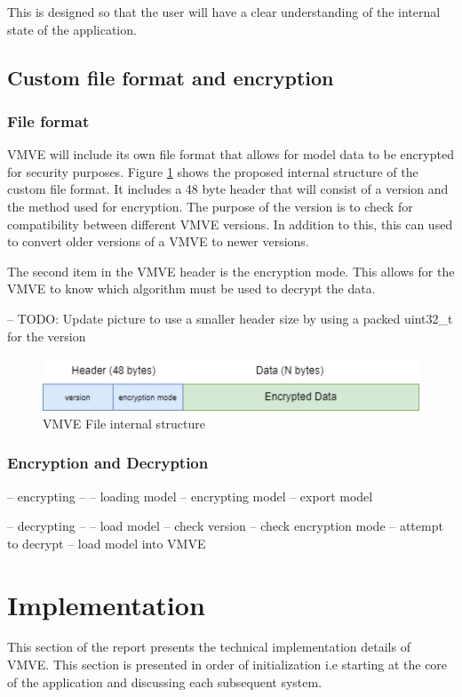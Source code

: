 \documentclass[11pt]{article}
\begin{document}
This is designed so that the user will have a clear understanding of the internal state
of the application.

\subsection{Custom file format and encryption}

\subsubsection{File format}
VMVE will include its own file format that allows for model data to be encrypted for security purposes.
Figure \ref{fig:vmve_file_structure} shows the proposed internal structure of the custom file format.
It includes a 48 byte header that will consist of a version and the method used for encryption.
The purpose of the version is to check for compatibility between different VMVE versions. In addition to this,
this can used to convert older versions of a VMVE to newer versions.

The second item in the VMVE header is the encryption mode. This allows for the VMVE to know which algorithm
must be used to decrypt the data.

-- TODO: Update picture to use a smaller header size by using a packed uint32\_t for the version

\begin{figure}[ht]
  \centering
  \includegraphics[width=\textwidth]{images/vmve_file_structure.png}
  \caption{VMVE File internal structure}
  \label{fig:vmve_file_structure}
\end{figure}


\subsubsection{Encryption and Decryption}
-- encrypting --
-- loading model
-- encrypting model
-- export model


-- decrypting --
-- load model 
-- check version
-- check encryption mode
-- attempt to decrypt
-- load model into VMVE

\section{Implementation}
This section of the report presents the technical implementation details of
VMVE. This section is presented in order of initialization i.e starting at
the core of the application and discussing each subsequent system.
\end{document}
